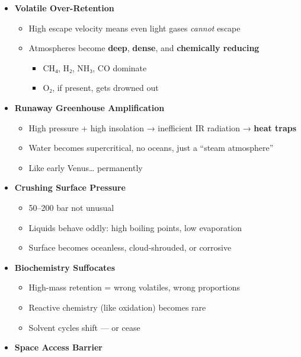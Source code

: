 \documentclass[
  letterpaper,
]{book}
\providecommand{\tightlist}{%
  \setlength{\itemsep}{0pt}\setlength{\parskip}{0pt}}
\begin{document}
\begin{itemize}
\tightlist
\item
  \textbf{Volatile Over-Retention}

  \begin{itemize}
  \tightlist
  \item
    High escape velocity means even light gases \emph{cannot} escape
  \item
    Atmospheres become \textbf{deep}, \textbf{dense}, and
    \textbf{chemically reducing}

    \begin{itemize}
    \tightlist
    \item
      CH₄, H₂, NH₃, CO dominate
    \item
      O₂, if present, gets drowned out
    \end{itemize}
  \end{itemize}
\item
  \textbf{Runaway Greenhouse Amplification}

  \begin{itemize}
  \tightlist
  \item
    High pressure + high insolation → inefficient IR radiation →
    \textbf{heat traps}
  \item
    Water becomes supercritical, no oceans, just a ``steam atmosphere''
  \item
    Like early Venus\ldots{} permanently
  \end{itemize}
\item
  \textbf{Crushing Surface Pressure}

  \begin{itemize}
  \tightlist
  \item
    50--200 bar not unusual
  \item
    Liquids behave oddly: high boiling points, low evaporation
  \item
    Surface becomes oceanless, cloud-shrouded, or corrosive
  \end{itemize}
\item
  \textbf{Biochemistry Suffocates}

  \begin{itemize}
  \tightlist
  \item
    High-mass retention = wrong volatiles, wrong proportions
  \item
    Reactive chemistry (like oxidation) becomes rare
  \item
    Solvent cycles shift --- or cease
  \end{itemize}
\item
  \textbf{Space Access Barrier}


\end{itemize}
\end{document}
